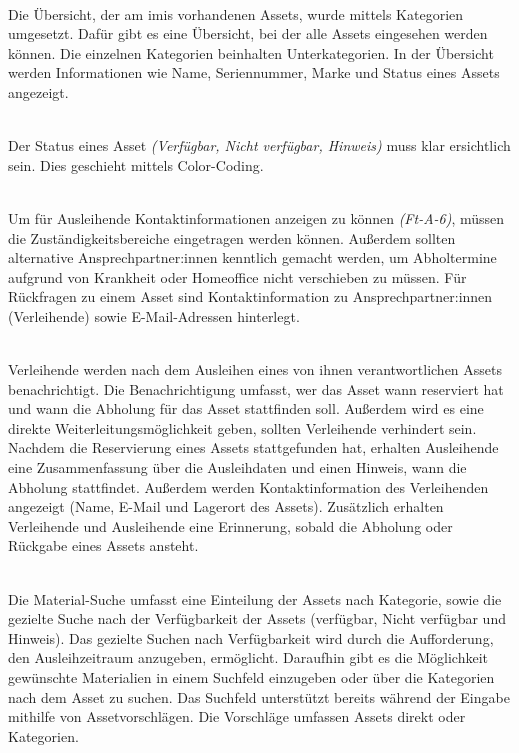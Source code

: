     {\sffamily\color{maincolor}{Ft-VA-2 | Übersicht über ausleihbare Assets }}\\
Die Übersicht, der am \ac{imis} vorhandenen Assets, wurde mittels Kategorien umgesetzt. Dafür gibt es
eine Übersicht, bei der alle Assets eingesehen werden können. Die einzelnen Kategorien beinhalten
Unterkategorien. In der Übersicht werden Informationen wie Name, Seriennummer, Marke und Status
eines Assets angezeigt.

    {\sffamily\color{maincolor}{Ft-VA-3 |  Verfügbarkeit von Assets }}\\
Der Status eines Asset \textit{(Verfügbar, Nicht verfügbar, Hinweis)} muss klar ersichtlich sein.
Dies geschieht mittels Color-Coding.  


{\sffamily\color{maincolor}{Ft-VA-4 | Zuständigkeitsbereich }}\\
Um für Ausleihende Kontaktinformationen anzeigen zu können \textit{(Ft-A-6)}, müssen die
Zuständigkeitsbereiche eingetragen werden können. Außerdem sollten alternative Ansprechpartner:innen
kenntlich gemacht werden, um Abholtermine aufgrund von Krankheit oder Homeoffice nicht verschieben
zu müssen. Für Rückfragen zu einem Asset sind Kontaktinformation zu Ansprechpartner:innen
(Verleihende) sowie E-Mail-Adressen hinterlegt.

{\sffamily\color{maincolor}{Ft-VA-5 | Benachrichtigungen \& Erinnerungen }}\\
Verleihende werden nach dem Ausleihen eines von ihnen verantwortlichen Assets benachrichtigt. Die
Benachrichtigung umfasst, wer das Asset wann reserviert hat und wann die Abholung für
das Asset stattfinden soll. Außerdem wird es eine direkte Weiterleitungsmöglichkeit geben, sollten
Verleihende verhindert sein. Nachdem die Reservierung eines Assets stattgefunden hat, erhalten
Ausleihende eine Zusammenfassung über die Ausleihdaten und einen Hinweis, wann die Abholung
stattfindet. Außerdem werden Kontaktinformation des Verleihenden angezeigt (Name, E-Mail und
Lagerort des Assets). Zusätzlich erhalten Verleihende und Ausleihende eine Erinnerung, sobald die
Abholung oder Rückgabe eines Assets ansteht.


    {\sffamily\color{maincolor}{Ft-VA-6 | Material-Suche }}\\
Die Material-Suche umfasst eine Einteilung der Assets nach Kategorie, sowie die gezielte Suche nach
der Verfügbarkeit der Assets (verfügbar, Nicht verfügbar und Hinweis). Das gezielte Suchen nach
Verfügbarkeit wird durch die Aufforderung, den Ausleihzeitraum anzugeben, ermöglicht. Daraufhin gibt
es die Möglichkeit gewünschte Materialien in einem Suchfeld einzugeben oder über die Kategorien nach
dem Asset zu suchen. Das Suchfeld unterstützt bereits während der Eingabe mithilfe von
Assetvorschlägen. Die Vorschläge umfassen Assets direkt oder Kategorien. 

